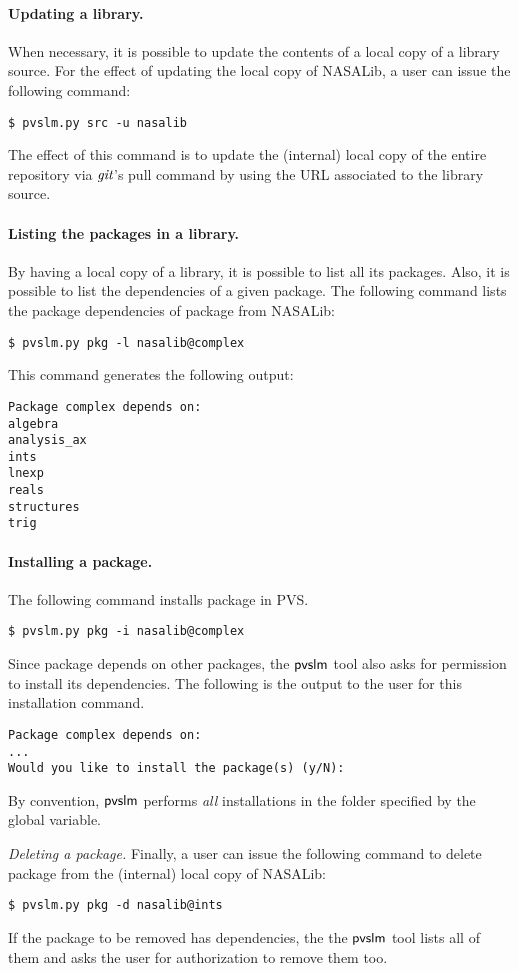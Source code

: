 \paragraph{Updating a library.} When necessary, it is possible to update
the contents of a local copy of a library source. For the effect of
updating the local copy of NASALib, a user can issue the following
command:
%
\begin{verbatim}
$ pvslm.py src -u nasalib
\end{verbatim}
%
The effect of this command is to update the (internal) local copy of
the entire repository via $\textit{git}$'s pull command by using the URL
associated to the library source.

\paragraph{Listing the packages in a library.} By having a local
copy of a library, it is possible to list all its packages. Also, it
is possible to list the dependencies of a given package. The following
command lists the package dependencies of package  from
NASALib:
%
\begin{verbatim}
$ pvslm.py pkg -l nasalib@complex
\end{verbatim}
%
This command generates the following output:
%
\begin{verbatim}
Package complex depends on:
algebra
analysis_ax
ints
lnexp
reals
structures
trig
\end{verbatim}

\paragraph{Installing a package.} The following command installs package
 in PVS.
%
\begin{verbatim}
$ pvslm.py pkg -i nasalib@complex
\end{verbatim}
%
Since package  depends on other packages, the $\textsf{pvslm}$
tool also asks for permission to install its dependencies. The
following is the output to the user for this installation command.
%
\begin{verbatim}
Package complex depends on:
...
Would you like to install the package(s) (y/N): 
\end{verbatim}
%
By convention, $\textsf{pvslm}$ performs {\em all} installations in the folder
specified by the  global variable.

{\em Deleting a package.} Finally, a user can issue the following
command to delete package  from the (internal) local copy of
NASALib:
%
\begin{verbatim}
$ pvslm.py pkg -d nasalib@ints
\end{verbatim}
%
If the package to be removed has dependencies, the the $\textsf{pvslm}$ tool
lists all of them and asks the user for authorization to remove them
too.

